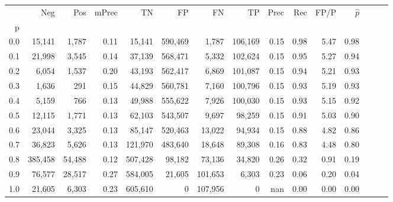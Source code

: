 \begin{tabular}{rrrrrrrrrrrrrrr}
\toprule
{} &      Neg &     Pos & mPrec &       TN &       FP &       FN &       TP &  Prec &   Rec &  FP/P & $\hat{p}$ \\
p   &          &         &       &          &          &          &          &       &       &       &           \\
\midrule
0.0 &   15,141 &   1,787 &  0.11 &   15,141 &  590,469 &    1,787 &  106,169 &  0.15 &  0.98 &  5.47 &      0.98 \\
0.1 &   21,998 &   3,545 &  0.14 &   37,139 &  568,471 &    5,332 &  102,624 &  0.15 &  0.95 &  5.27 &      0.94 \\
0.2 &    6,054 &   1,537 &  0.20 &   43,193 &  562,417 &    6,869 &  101,087 &  0.15 &  0.94 &  5.21 &      0.93 \\
0.3 &    1,636 &     291 &  0.15 &   44,829 &  560,781 &    7,160 &  100,796 &  0.15 &  0.93 &  5.19 &      0.93 \\
0.4 &    5,159 &     766 &  0.13 &   49,988 &  555,622 &    7,926 &  100,030 &  0.15 &  0.93 &  5.15 &      0.92 \\
0.5 &   12,115 &   1,771 &  0.13 &   62,103 &  543,507 &    9,697 &   98,259 &  0.15 &  0.91 &  5.03 &      0.90 \\
0.6 &   23,044 &   3,325 &  0.13 &   85,147 &  520,463 &   13,022 &   94,934 &  0.15 &  0.88 &  4.82 &      0.86 \\
0.7 &   36,823 &   5,626 &  0.13 &  121,970 &  483,640 &   18,648 &   89,308 &  0.16 &  0.83 &  4.48 &      0.80 \\
0.8 &  385,458 &  54,488 &  0.12 &  507,428 &   98,182 &   73,136 &   34,820 &  0.26 &  0.32 &  0.91 &      0.19 \\
0.9 &   76,577 &  28,517 &  0.27 &  584,005 &   21,605 &  101,653 &    6,303 &  0.23 &  0.06 &  0.20 &      0.04 \\
1.0 &   21,605 &   6,303 &  0.23 &  605,610 &        0 &  107,956 &        0 &   nan &  0.00 &  0.00 &      0.00 \\
\bottomrule
\end{tabular}
